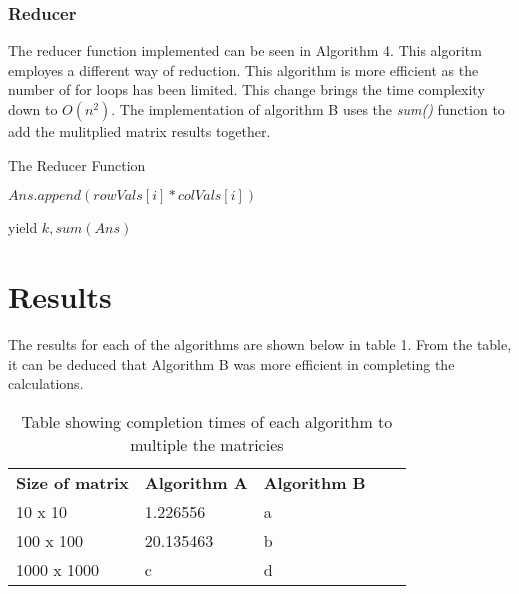 \documentclass[twocolumn]{IEEEtran}
\begin{document}
		
	\subsubsection{Reducer}
	The reducer function implemented can be seen in Algorithm 4. This algoritm employes a different way of reduction. This algorithm is more efficient as the number of for loops has been limited. This change brings the time complexity down to $O(n^{2})$. The implementation of algorithm B uses the \textit{sum()} function to add the mulitplied matrix results together.
	
	
		
		\begin{algorithm}
			\caption{The Reducer Function}
			\begin{algorithmic} 
				
				
				
				\ENDIF
				\ENDIF
				
				\ENDFOR
				\STATE $Ans.append(rowVals[i]*colVals[i])$
				\ENDFOR
				
				\STATE yield $ k,sum(Ans)$
				
			
			\end{algorithmic}
		\end{algorithm}
	
	\section{Results}
	The results for each of the algorithms are shown below in table 1. From the table, it can be deduced that Algorithm B was more efficient in completing the calculations.
	
\begin{table}[!h]
	\centering
	\caption{Table showing completion times of each algorithm to multiple the matricies}
	\label{my-label}
	\begin{tabular}{|l|l|l|ll}
		\cline{1-3}
		\textbf{Size of matrix} & \textbf{Algorithm A} & \textbf{Algorithm B} &  &  \\ \cline{1-3}
		10 x 10                 & 1.226556             & a                    &  &  \\ \cline{1-3}
		100 x 100               & 20.135463            & b                    &  &  \\ \cline{1-3}
		1000 x 1000             & c                    & d                    &  &  \\ \cline{1-3}
	\end{tabular}
\end{table}
	
\end{document}
